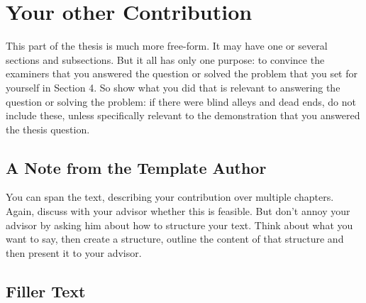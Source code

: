\chapter{Your other Contribution}
\label{chap:contribution2}
This part of the thesis is much more free-form. It may have one or
several sections and subsections. But it all has only one purpose: to convince
the examiners that you answered the question or solved the problem that you
set for yourself in Section 4. So show what you did that is relevant to
answering the question or solving the problem: if there were blind alleys and
dead ends, do not include these, unless specifically relevant to the
demonstration that you answered the thesis question. 

\section{A Note from the Template Author}
You can span the text, describing your contribution over multiple chapters.
Again, discuss with your advisor whether this is feasible. But don't annoy
your advisor by asking him about how to structure your text. Think about what
you want to say, then create a structure, outline the content of that
structure and then present it to your advisor. 

\section{Filler Text}
\Blindtext

